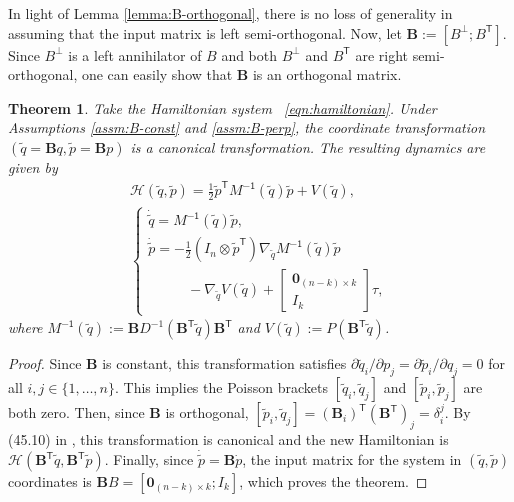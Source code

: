 \documentclass[journal,twoside,web]{ieeecolor}
\newtheorem{thm}{Theorem}%
\newcommand*{\tpose}{^\mathsf{T}}
\newcommand*{\Minv}{M^\mathsf{-1}}
\newcommand*{\Id}[1]{I_{#1}}
\newcommand*{\Zmat}[1]{\bm{0}_{#1}}
\newcommand*{\simpleB}{\begin{bmatrix}\Zmat{(n-k)\times k}\\ \Id{k}\end{bmatrix}}
\begin{document}
In light of Lemma \ref{lemma:B-orthogonal}, there is no loss of generality in
assuming that the input matrix is left semi-orthogonal.
Now, let \(\mathbf{B} := [B^\perp; B\tpose]\).
Since \(B^\perp\) is a left annihilator of \(B\) and both \(B^\perp\) and
\(B\tpose\) are right semi-orthogonal, one can easily show that \(\mathbf{B}\) is
an orthogonal matrix.

\begin{thm}\label{thm:simply-actuated}
    Take the Hamiltonian system ~\eqref{eqn:hamiltonian}.
    Under Assumptions \ref{assm:B-const} and \ref{assm:B-perp},
    the coordinate transformation
    \(\left(\tilde{q} = \mathbf{B}q, \tilde{p} = \mathbf{B}p\right)\)
    is a canonical transformation.
    The resulting dynamics are given by 
    \begin{gather}\label{eqn:simple-hamiltonian}
        \mathcal{H}(\tilde{q},\tilde{p}) = 
        \frac{1}{2} \tilde{p}\tpose \Minv(\tilde{q}) \tilde{p} + V(\tilde{q})
        , \\
       \begin{cases}
           \dot{\tilde{q}} = \Minv(\tilde{q})\tilde{p}
           , \\
           \dot{\tilde{p}} = -\frac{1}{2} (\Id{n} \otimes \tilde{p}\tpose)
           \nabla_{\tilde{q}} \Minv(\tilde{q}) \tilde{p} \\
           \phantom{---} - \nabla_{\tilde{q}} V(\tilde{q}) + \simpleB \tau
            ,
        \end{cases} \nonumber
    \end{gather}
    where 
    \(\Minv(\tilde{q}) := 
    \mathbf{B}D^{-1}(\mathbf{B}\tpose \tilde{q})\mathbf{B}\tpose\)
    and
    \(V(\tilde{q}) := P(\mathbf{B}\tpose \tilde{q})\).
\end{thm}
\begin{proof}
    Since \(\mathbf{B}\) is constant, this transformation satisfies
    \(\partial\tilde{q}_i/\partial p_j = \partial\tilde{p}_i/\partial q_j = 0\) for all 
    \(i,j \in \{1,\ldots,n\}\).
    This implies the Poisson brackets \([\tilde{q}_i, \tilde{q}_j]\)
    and \([\tilde{p}_i,\tilde{p}_j]\) are both zero.
    Then, since \(\mathbf{B}\) is orthogonal, 
    \([\tilde{p}_i, \tilde{q}_j] = (\mathbf{B}_i)\tpose (\mathbf{B}\tpose)_j
        = \delta_i^j\).
    By (45.10) in \cite{landau_mechanics}, this transformation is canonical and
    the new Hamiltonian is
    \(\mathcal{H}(\mathbf{B}\tpose \tilde{q}, \mathbf{B}\tpose \tilde{p})\).
    Finally, since \(\dot{\tilde{p}} = \mathbf{B} \dot{p}\), the input
    matrix for the system in \((\tilde{q},\tilde{p})\) coordinates is
    \(\mathbf{B}B = [\Zmat{(n-k)\times k}; \Id{k}]\), which proves the theorem.
\end{proof}
\end{document}
